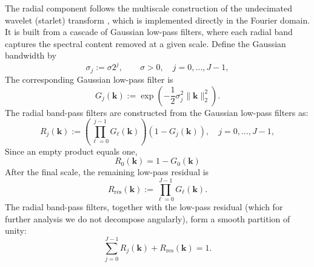 \documentclass{article}
\begin{document}
The radial component follows the multiscale construction of the undecimated wavelet (starlet) transform \cite{starck2007undecimated}, which is implemented directly in the Fourier domain. It is built from a cascade of Gaussian low-pass filters, where each radial band captures the spectral content removed at a given scale.
Define the Gaussian bandwidth by
\begin{equation}
\label{eqn:radialSigma}
\sigma_{j}:=\sigma 2^{j},
\qquad
\sigma>0,
\quad
j=0,\ldots,J-1,
\end{equation}
The corresponding Gaussian low-pass filter is
\begin{equation} 
\label{eqn:radialGaussian} G_j(\mathbf{k}) := \exp\left( -\frac{1}{2}\sigma_{j}^2 \|\mathbf{k}\|_2^2 \right). 
\end{equation}
The radial band-pass filters are constructed from the Gaussian low-pass filters as:
\begin{equation} 
\label{eqn:radialWindow} R_j(\mathbf{k}) := \left( \prod_{\ell=0}^{j-1} G_\ell(\mathbf{k}) \right) \left( 1-G_j(\mathbf{k}) \right), \quad j=0,\ldots,J-1, 
\end{equation}
\noindent
Since an empty product equals one,
\begin{equation}
R_0(\mathbf{k}) = 1-G_0(\mathbf{k})
\end{equation}
After the final scale, the remaining low-pass residual is
\begin{equation} 
\label{eqn:radialResidual} 
R_{\mathrm{res}}(\mathbf{k}) := \prod_{\ell=0}^{J-1} G_\ell(\mathbf{k}).
\end{equation}
The radial band-pass filters, together with the low-pass residual (which for further analysis we do not decompose angularly), form a smooth partition of unity:
\begin{equation} 
\label{eqn:radialPartition} 
\sum_{j=0}^{J-1} R_j(\mathbf{k}) + R_{\mathrm{res}}(\mathbf{k}) = 1.
\end{equation}
\end{document}
